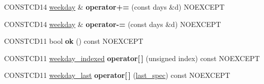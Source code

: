 \begin{DoxyCompactItemize}
\item 
\mbox{\label{classdate_1_1weekday_aeb8f547ed20b5b221cfa0b06212772b4}} 
C\+O\+N\+S\+T\+C\+D14 \mbox{\hyperlink{classdate_1_1weekday}{weekday}} \& {\bfseries operator+=} (const days \&d) N\+O\+E\+X\+C\+E\+PT
\item 
\mbox{\label{classdate_1_1weekday_a0631de8f0b07b51e39bacab4897609a8}} 
C\+O\+N\+S\+T\+C\+D14 \mbox{\hyperlink{classdate_1_1weekday}{weekday}} \& {\bfseries operator-\/=} (const days \&d) N\+O\+E\+X\+C\+E\+PT
\item 
\mbox{\label{classdate_1_1weekday_ae96e1724ac8c13d49b617db033a39d32}} 
C\+O\+N\+S\+T\+C\+D11 bool {\bfseries ok} () const N\+O\+E\+X\+C\+E\+PT
\item 
\mbox{\label{classdate_1_1weekday_ab866200e9d16ddfe1d1246b2a838c7a7}} 
C\+O\+N\+S\+T\+C\+D11 \mbox{\hyperlink{classdate_1_1weekday__indexed}{weekday\+\_\+indexed}} {\bfseries operator\mbox{[}$\,$\mbox{]}} (unsigned index) const N\+O\+E\+X\+C\+E\+PT
\item 
\mbox{\label{classdate_1_1weekday_a885fd8d238f7bf4e79d0245864b56fe4}} 
C\+O\+N\+S\+T\+C\+D11 \mbox{\hyperlink{classdate_1_1weekday__last}{weekday\+\_\+last}} {\bfseries operator\mbox{[}$\,$\mbox{]}} (\mbox{\hyperlink{structdate_1_1last__spec}{last\+\_\+spec}}) const N\+O\+E\+X\+C\+E\+PT
\end{DoxyCompactItemize}
